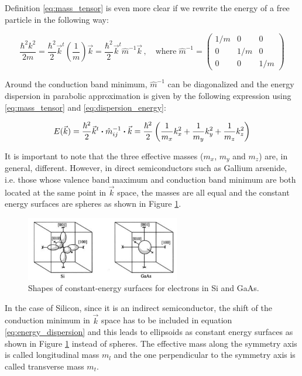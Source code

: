 \documentclass[11pt,a4paper]{article}
\begin{document}
Definition \eqref{eq:mass_tensor} is even more clear if we rewrite the energy of a free particle in the following way:

\begin{equation*}
\frac{\hbar^2k^2}{2m}=\frac{\hbar^2}{2}\vec{k}^t\left(\frac{1}{m}\right)\vec{k}=\frac{\hbar^2}{2}\vec{k}^t\hat{m}^{-1}\vec{k}\,,
\quad\text{where}\;\hat{m}^{-1}=
\begin{pmatrix*}
1/m & 0 & 0 \\
0 & 1/m & 0 \\
0 & 0 & 1/m
\end{pmatrix*}
\end{equation*}

Around the conduction band minimum, $\hat{m}^{-1}$ can be diagonalized and the energy dispersion in parabolic approximation is given by the following expression using \eqref{eq:mass_tensor} and \eqref{eq:dispersion_energy}:

\begin{equation}\label{eq:energy_dispersion}
E(\vec{k})=\frac{\hbar^2}{2}\vec{k}^t\vdot\hat{m}_{ij}^{-1}\vdot\vec{k}=\frac{\hbar^2}{2}\left(\frac{1}{m_x}k_x^2+\frac{1}{m_y}k_y^2+\frac{1}{m_z}k_z^2\right)
\end{equation}

It is important to note that the three effective masses ($m_x$, $m_y$ and $m_z$) are, in general, different. However, in direct semiconductors such as Gallium arsenide, i.e. those whose valence band maximum and conduction band minimum are both located at the same point in $\vec{k}$ space, the masses are all equal and the constant energy surfaces are spheres as shown in Figure \ref{fig:energy_surfaces}.

\begin{figure}[ht]
\centering
\includegraphics[width=0.6\textwidth]{energy_surfaces}
\caption{Shapes of constant-energy surfaces for electrons in Si and GaAs.\cite{sze2006physics}}
\label{fig:energy_surfaces}
\end{figure}

In the case of Silicon, since it is an indirect semiconductor, the shift of the conduction minimum in $\vec{k}$ space has to be included in equation \eqref{eq:energy_dispersion} and this leads to ellipsoids as constant energy surfaces as shown in Figure \ref{fig:energy_surfaces} instead of spheres. The effective mass along the symmetry axis is called longitudinal mass $m_l$ and the one perpendicular to the symmetry axis is called transverse mass $m_t$.
\end{document}
